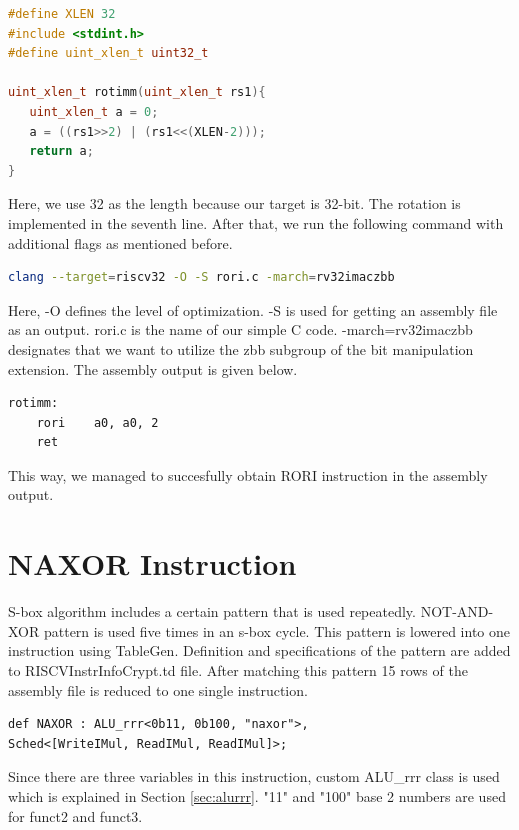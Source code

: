 \begin{lstlisting}[language=C++]
#define XLEN 32
#include <stdint.h>
#define uint_xlen_t uint32_t

uint_xlen_t rotimm(uint_xlen_t rs1){
   uint_xlen_t a = 0;
   a = ((rs1>>2) | (rs1<<(XLEN-2)));
   return a;
}
\end{lstlisting}

Here, we use 32 as the length because our target is 32-bit. The rotation is implemented in the seventh line. After that, we run the following command with additional flags as mentioned before.

\begin{lstlisting}[language=Bash]
clang --target=riscv32 -O -S rori.c -march=rv32imaczbb
\end{lstlisting}

Here, -O defines the level of optimization. -S is used for getting an assembly file as an output. rori.c is the name of our simple C code. -march=rv32imaczbb designates that we want to utilize the zbb subgroup of the bit manipulation extension. The assembly output is given below.%

\begin{lstlisting}
rotimm:
	rori	a0, a0, 2
	ret
\end{lstlisting}

This way, we managed to succesfully obtain RORI instruction in the assembly output.

\section{NAXOR Instruction}

S-box algorithm includes a certain pattern that is used repeatedly. NOT-AND-XOR pattern is used five times in an s-box cycle. This pattern is lowered into one instruction using TableGen. Definition and specifications of the pattern are added to RISCVInstrInfoCrypt.td file. After matching this pattern 15 rows of the assembly file is reduced to one single instruction. 

\begin{lstlisting}
def NAXOR : ALU_rrr<0b11, 0b100, "naxor">,
Sched<[WriteIMul, ReadIMul, ReadIMul]>;
\end{lstlisting}

Since there are three variables in this instruction, custom ALU\_rrr class is used which is explained in Section \ref{sec:alurrr}. "11" and "100" base 2 numbers are used for funct2 and funct3.

